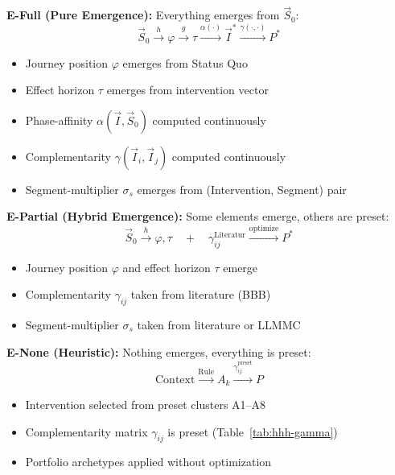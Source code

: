 \begin{tcolorbox}[colback=blue!5!white, colframe=blue!75!black,
    title=\textbf{Definition: Emergence Modes (E-Full, E-Partial, E-None)}]

\textbf{E-Full (Pure Emergence):} Everything emerges from $\vec{S}_0$:
\begin{equation}
\vec{S}_0 \xrightarrow{h} \varphi \xrightarrow{g} \tau \xrightarrow{\alpha(\cdot)} \vec{I}^* \xrightarrow{\gamma(\cdot,\cdot)} P^*
\end{equation}
\begin{itemize}[nosep]
    \item Journey position $\varphi$ emerges from Status Quo
    \item Effect horizon $\tau$ emerges from intervention vector
    \item Phase-affinity $\alpha(\vec{I}, \vec{S}_0)$ computed continuously
    \item Complementarity $\gamma(\vec{I}_i, \vec{I}_j)$ computed continuously
    \item Segment-multiplier $\sigma_s$ emerges from (Intervention, Segment) pair
\end{itemize}

\textbf{E-Partial (Hybrid Emergence):} Some elements emerge, others are preset:
\begin{equation}
\vec{S}_0 \xrightarrow{h} \varphi, \tau \quad + \quad \gamma_{ij}^{\text{Literatur}} \xrightarrow{\text{optimize}} P^*
\end{equation}
\begin{itemize}[nosep]
    \item Journey position $\varphi$ and effect horizon $\tau$ emerge
    \item Complementarity $\gamma_{ij}$ taken from literature (BBB)
    \item Segment-multiplier $\sigma_s$ taken from literature or LLMMC
\end{itemize}

\textbf{E-None (Heuristic):} Nothing emerges, everything is preset:
\begin{equation}
\text{Context} \xrightarrow{\text{Rule}} A_k \xrightarrow{\gamma_{ij}^{\text{preset}}} P
\end{equation}
\begin{itemize}[nosep]
    \item Intervention selected from preset clusters A1--A8
    \item Complementarity matrix $\gamma_{ij}$ is preset (Table~\ref{tab:hhh-gamma})
    \item Portfolio archetypes applied without optimization
\end{itemize}
\end{tcolorbox}

